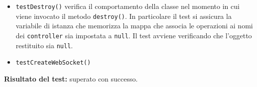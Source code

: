 \begin{itemize}
\begin{itemize}
\item \texttt{testDestroy()} verifica il comportamento della classe nel momento in cui viene invocato il metodo \texttt{destroy()}. In particolare il test si assicura la variabile di istanza che memorizza la mappa che associa le operazioni ai nomi dei \texttt{controller} sia impostata a \texttt{null}.
Il test avviene verificando che l'oggetto restituito sia \texttt{null}.
\item \texttt{testCreateWebSocket()} 

 \end{itemize}
\textbf{Risultato del test:} superato con successo.





\end{itemize}







